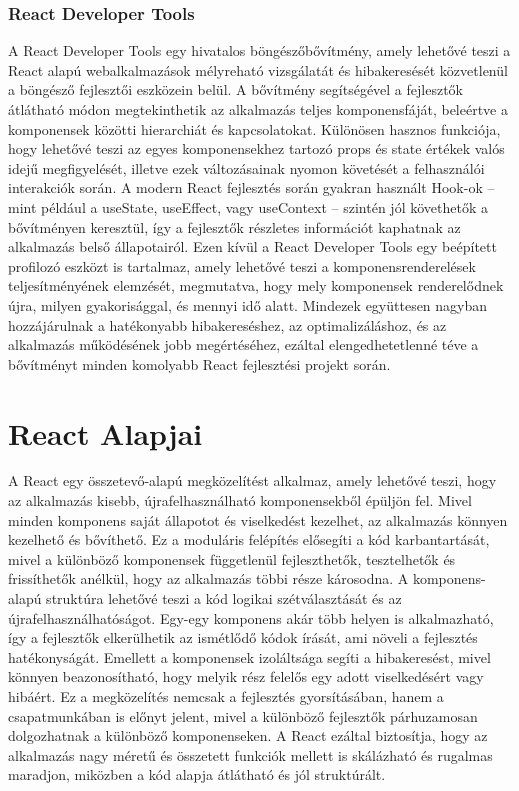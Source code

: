 \documentclass[colorlinks]{thesis-kando}
\theoremstyle{definition}
\theoremstyle{remark}
\begin{document}
\subsubsection{React Developer Tools}
A React Developer Tools egy hivatalos böngészőbővítmény, amely lehetővé teszi a React alapú webalkalmazások mélyreható vizsgálatát és hibakeresését közvetlenül a böngésző fejlesztői eszközein belül. A bővítmény segítségével a fejlesztők átlátható módon megtekinthetik az alkalmazás teljes komponensfáját, beleértve a komponensek közötti hierarchiát és kapcsolatokat. Különösen hasznos funkciója, hogy lehetővé teszi az egyes komponensekhez tartozó props és state értékek valós idejű megfigyelését, illetve ezek változásainak nyomon követését a felhasználói interakciók során. A modern React fejlesztés során gyakran használt Hook-ok – mint például a useState, useEffect, vagy useContext – szintén jól követhetők a bővítményen keresztül, így a fejlesztők részletes információt kaphatnak az alkalmazás belső állapotairól. Ezen kívül a React Developer Tools egy beépített profilozó eszközt is tartalmaz, amely lehetővé teszi a komponensrenderelések teljesítményének elemzését, megmutatva, hogy mely komponensek renderelődnek újra, milyen gyakorisággal, és mennyi idő alatt. Mindezek együttesen nagyban hozzájárulnak a hatékonyabb hibakereséshez, az optimalizáláshoz, és az alkalmazás működésének jobb megértéséhez, ezáltal elengedhetetlenné téve a bővítményt minden komolyabb React fejlesztési projekt során.

\section{React Alapjai}
A React egy összetevő-alapú megközelítést alkalmaz, amely lehetővé teszi, hogy az alkalmazás kisebb, újrafelhasználható komponensekből épüljön fel. Mivel minden komponens saját állapotot és viselkedést kezelhet, az alkalmazás könnyen kezelhető és bővíthető. Ez a moduláris felépítés elősegíti a kód karbantartását, mivel a különböző komponensek függetlenül fejleszthetők, tesztelhetők és frissíthetők anélkül, hogy az alkalmazás többi része károsodna. A komponens-alapú struktúra lehetővé teszi a kód logikai szétválasztását és az újrafelhasználhatóságot. Egy-egy komponens akár több helyen is alkalmazható, így a fejlesztők elkerülhetik az ismétlődő kódok írását, ami növeli a fejlesztés hatékonyságát. Emellett a komponensek izoláltsága segíti a hibakeresést, mivel könnyen beazonosítható, hogy melyik rész felelős egy adott viselkedésért vagy hibáért. Ez a megközelítés nemcsak a fejlesztés gyorsításában, hanem a csapatmunkában is előnyt jelent, mivel a különböző fejlesztők párhuzamosan dolgozhatnak a különböző komponenseken. A React ezáltal biztosítja, hogy az alkalmazás nagy méretű és összetett funkciók mellett is skálázható és rugalmas maradjon, miközben a kód alapja átlátható és jól struktúrált.
\end{document}
